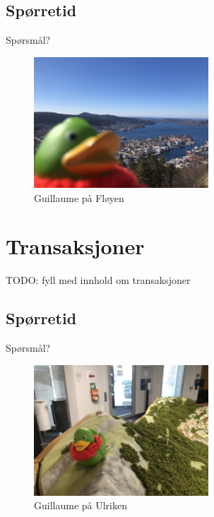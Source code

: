 \subsection*{Spørretid}
\begin{frame}{Spørsmål?}
    \begin{figure}
        \centering
        \includegraphics[height = 4.9cm]{images/guillaume10.jpg}
        \caption{Guillaume på Fløyen}
        \label{fig:guillaume10}
    \end{figure}
\end{frame}


\section{Transaksjoner}
\begin{frame}{}
    TODO: fyll med innhold om transaksjoner
\end{frame}

\subsection*{Spørretid}
\begin{frame}{Spørsmål?}
    \begin{figure}
        \centering
        \includegraphics[height = 4.9cm]{images/guillaume11.jpg}
        \caption{Guillaume på Ulriken}
        \label{fig:guillaume11}
    \end{figure}
\end{frame}


